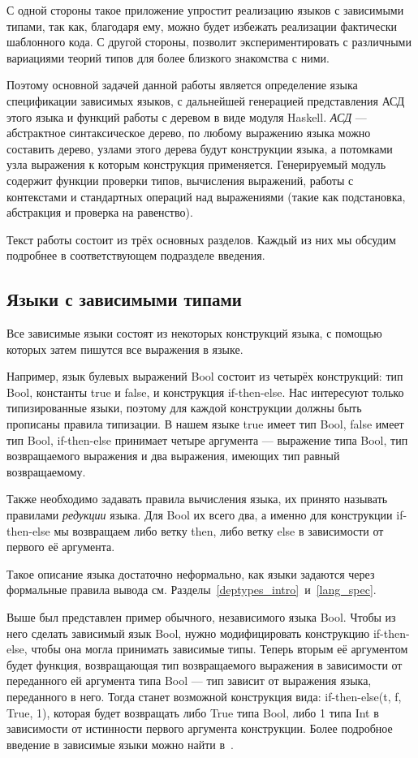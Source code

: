 С одной стороны такое приложение упростит реализацию языков с зависимыми типами, так как, благодаря ему, можно будет избежать реализации фактически шаблонного кода. С другой стороны, позволит экспериментировать с различными вариациями теорий типов для более близкого знакомства с ними.

Поэтому основной задачей данной работы является определение языка спецификации зависимых языков, с дальнейшей генерацией представления АСД этого языка и функций работы с деревом в виде модуля Haskell\cite{haskell}. \textit{АСД} --- абстрактное синтаксическое дерево, по любому выражению языка можно составить дерево, узлами этого дерева будут конструкции языка, а потомками узла выражения к которым конструкция применяется. Генерируемый модуль содержит функции проверки типов, вычисления выражений, работы с контекстами и стандартных операций над выражениями (такие как подстановка, абстракция и проверка на равенство).

Текст работы состоит из трёх основных разделов. Каждый из них мы обсудим подробнее в соответствующем подразделе введения.

\subsection*{Языки с зависимыми типами}

Все зависимые языки состоят из некоторых конструкций языка, с помощью которых затем пишутся все выражения в языке.

Например, язык булевых выражений Bool состоит из четырёх конструкций: тип Bool, константы true и false, и конструкция if-then-else. Нас интересуют только типизированные языки, поэтому для каждой конструкции должны быть прописаны правила типизации. В нашем языке true имеет тип Bool, false имеет тип Bool, if-then-else принимает четыре аргумента --- выражение типа Bool, тип возвращаемого выражения и два выражения, имеющих тип равный возвращаемому.

Также необходимо задавать правила вычисления языка, их принято называть правилами \textit{редукции} языка. Для Bool их всего два, а именно для конструкции if-then-else мы возвращаем либо ветку then, либо ветку else в зависимости от первого её аргумента.

Такое описание языка достаточно неформально, как языки задаются через формальные правила вывода см. Разделы~\ref{deptypes_intro}~и~\ref{lang_spec}.

Выше был представлен пример обычного, независимого языка Bool. Чтобы из него сделать зависимый язык Bool, нужно модифицировать конструкцию if-then-else, чтобы она могла принимать зависимые типы. Теперь вторым её аргументом будет функция, возвращающая тип возвращаемого выражения в зависимости от переданного ей аргумента типа Bool --- тип зависит от выражения языка, переданного в него. Тогда станет возможной конструкция вида: if-then-else(t, f, True, 1), которая будет возвращать либо True типа Bool, либо 1 типа Int в зависимости от истинности первого аргумента конструкции. Более подробное введение в зависимые языки можно найти в~\cite{martin_lof}.

